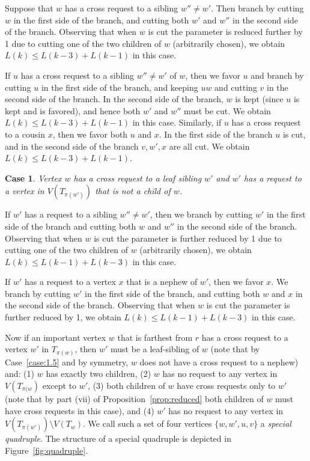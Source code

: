 \documentclass[11pt]{article}
\newtheorem{case}[theorem]{Case}
\begin{document}
Suppose that $w$ has a cross request to a sibling $w'' \neq w'$. Then branch by cutting $w$ in the first side of the branch, and cutting both $w'$ and $w''$ in the second side of the branch. Observing that when $w$ is cut the parameter is reduced further by 1 due to cutting one of the two children of $w$ (arbitrarily chosen), we obtain $L(k) \leq L(k-3) + L(k-1)$ in this case.

If $u$ has a cross request to a sibling $w'' \neq w'$ of $w$, then we favor $u$ and branch by cutting $u$ in the first
side of the branch, and keeping $uw$ and cutting $v$ in the second side of the branch. In the second side of the branch, $w$ is kept (since $u$ is kept and is favored), and hence both $w'$ and $w''$ must be cut. We obtain $L(k) \leq L(k-3) + L(k-1)$ in this case. Similarly, if $u$ has a cross request to a cousin $x$, then we favor both $u$ and $x$. In the first side of the branch $u$ is cut, and in the second side of the branch $v, w', x$ are all cut. We obtain $L(k) \leq L(k-3) + L(k-1)$.

\begin{case}\label{case:6}
Vertex $w$ has a cross request to a leaf sibling $w'$ and $w'$ has a request to a vertex in $V(T_{\pi(w')})$ that is not a child of $w$.
\end{case}

If $w'$ has a request to a sibling $w'' \neq w'$, then we branch by cutting $w'$ in the first side of the branch and cutting both $w$ and $w''$ in the second side of the branch. Observing that when $w$ is cut the parameter is further reduced by 1 due to cutting one of the two children of $w$ (arbitrarily chosen), we obtain $L(k) \leq L(k-1) + L(k-3)$ in this case.

If $w'$ has a request to a vertex $x$ that is a nephew of $w'$, then we favor $x$. We branch by cutting $w'$ in the first side of the branch, and cutting both $w$ and $x$ in the second side of the branch. Observing that when $w$ is cut the parameter is further reduced by 1, we obtain $L(k) \leq L(k-1) + L(k-3)$ in this case.


Now if an important vertex $w$ that is farthest from $r$ has a cross request to a vertex $w'$ in $T_{\pi(w)}$, then $w'$ must be a leaf-sibling of $w$ (note that by Case~\ref{case:1.5} and by symmetry, $w$ does not have a cross request to a nephew) and: (1) $w$ has exactly two children, (2) $w$ has no request to any vertex in $V(T_{\pi(w})$ except to $w'$, (3) both children of $w$ have cross requests only to $w'$ (note that by part (vii) of Proposition~\ref{prop:reduced} both children of $w$ must have cross requests in this case), and (4) $w'$ has no request to any vertex in $V(T_{\pi(w')}) \setminus V(T_w)$. We call such a set of four vertices $\{w, w', u, v\}$ a {\em special quadruple}. The structure of a special quadruple is depicted in Figure~\ref{fig:quadruple}.
\end{document}
